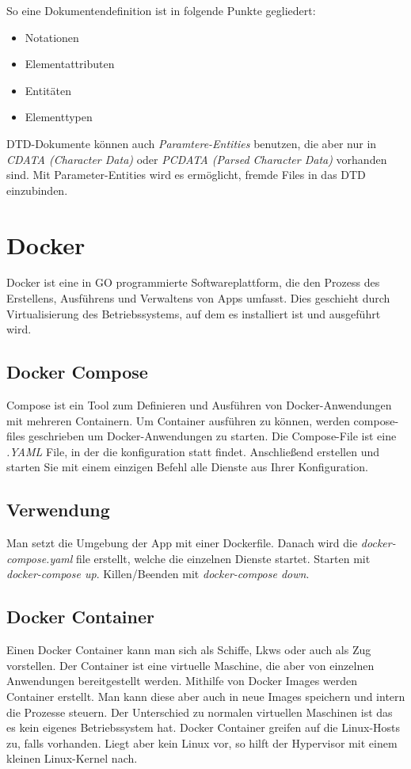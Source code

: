 \cite{DTD-Schema}
So eine Dokumentendefinition ist in folgende Punkte gegliedert:
\begin{itemize}
    \item Notationen
    \item Elementattributen
    \item Entitäten
    \item Elementtypen
\end{itemize}

DTD-Dokumente können auch \textit{Paramtere-Entities} benutzen, die aber nur in \textit{CDATA (Character Data)} 
oder \textit{PCDATA (Parsed Character Data)} vorhanden sind.
Mit Parameter-Entities wird es ermöglicht, fremde Files in das DTD einzubinden.


\section{Docker}
\author{Bozidar Spasenovic}
Docker ist eine in GO programmierte Softwareplattform, die den Prozess des Erstellens, Ausführens und Verwaltens von Apps umfasst.
Dies geschieht durch Virtualisierung des Betriebssystems, auf dem es installiert ist und ausgeführt wird. 
\subsection{Docker Compose}
\cite{Docker-Compose}
Compose ist ein Tool zum Definieren und Ausführen von Docker-Anwendungen mit mehreren Containern. 
Um Container ausführen zu können, werden compose-files geschrieben um Docker-Anwendungen zu starten.
Die Compose-File ist eine \textit{.YAML} File, in der die konfiguration statt findet. 
Anschließend erstellen und starten Sie mit einem einzigen Befehl alle Dienste aus Ihrer Konfiguration.


\subsection{Verwendung}

Man setzt die Umgebung der App mit einer Dockerfile.
Danach wird die \textit{docker-compose.yaml} file erstellt, welche die einzelnen Dienste startet.
Starten mit \textit{docker-compose up}.
Killen/Beenden mit \textit{docker-compose down}.


\subsection{Docker Container}
\cite{Docker-Container}
Einen Docker Container kann man sich als Schiffe, Lkws oder auch als Zug vorstellen. Der Container ist eine virtuelle Maschine, die aber von einzelnen Anwendungen bereitgestellt werden.
Mithilfe von Docker Images werden Container erstellt. Man kann diese aber auch in neue Images speichern und intern die Prozesse steuern.
Der Unterschied zu normalen virtuellen Maschinen ist das es kein eigenes Betriebssystem  hat. Docker Container greifen auf die Linux-Hosts
zu, falls vorhanden. Liegt aber kein Linux vor, so hilft der Hypervisor mit einem kleinen Linux-Kernel nach. 


